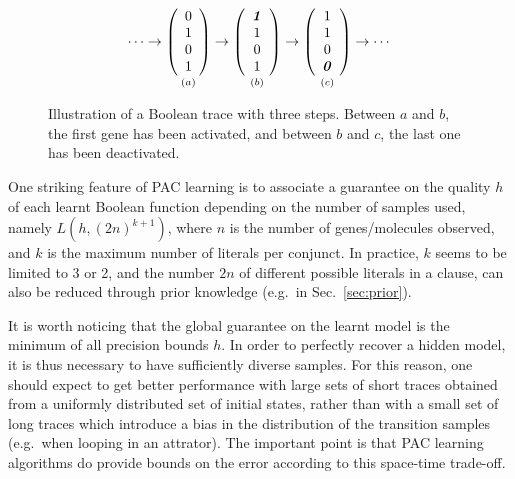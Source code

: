 \documentclass{llncs}
\begin{document}
\begin{figure}[htbp]
   {\large 
      \[
         \cdots
         \rightarrow
         \underset{\vspace{1em}(a)}{
            \left(\begin{array}{c}
                  0\\ 1\\ 0\\ 1
         \end{array}\right)}
         \rightarrow
         \underset{\vspace{1em}(b)}{
            \left(\begin{array}{c}
                  \textbf{\textit{1}}\\ 1\\ 0\\ 1
         \end{array}\right)}
         \rightarrow
         \underset{\vspace{1em}(c)}{
            \left(\begin{array}{c}
                  1\\ 1\\ 0\\ \textbf{\textit 0}
         \end{array}\right)}
         \rightarrow
         \cdots
      \]
   }
   \caption{Illustration of a Boolean trace with three steps. Between $a$ and
   $b$, the first gene has been activated, and between $b$ and $c$, the last
   one has been deactivated.}\label{steps}
\end{figure}



One striking feature of PAC learning is to associate a guarantee on the quality $h$ of each learnt Boolean
function depending on the number of samples used, namely $L(h, (2n)^{k+1})$,
where $n$ is the number of genes/molecules observed, and $k$ is the maximum number of literals per conjunct.
In practice, $k$ seems to be limited to 3 or 2, and the
number $2n$ of different possible literals in a clause, can also be reduced through
prior knowledge (e.g.~in Sec.~\ref{sec:prior}).

It is worth noticing that the global guarantee on the learnt model is the minimum of all precision bounds $h$.
In order to perfectly recover a hidden model, it is thus necessary to have sufficiently diverse samples. 
For this reason, one should expect to get better performance 
with large sets of short traces obtained from a uniformly distributed set of initial states,
rather than with a small set of long traces which introduce a bias in the distribution of the transition samples
(e.g.~when looping in an attrator).
The important point is that PAC learning algorithms do provide bounds on the error according to this space-time trade-off.
\end{document}
